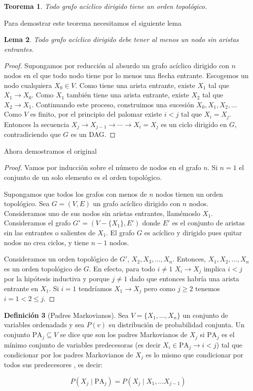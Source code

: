 \documentclass[a4paper,11pt,spanish, twoside]{tfg-uam-matematicas_25-26}
\newtheorem{teor}{Teorema}[chapter]
\newtheorem{lema}[teor]{Lema}
\theoremstyle{definition}
\newtheorem{defin}[teor]{Definición}
\begin{document}
\begin{teor}
Todo grafo acíclico dirigido tiene un orden topológico.
\end{teor}
Para demostrar este teorema necesitamos el siguiente lema
\begin{lema}
Todo grafo acíclico dirigido debe tener al menos un nodo sin aristas entrantes.
\end{lema}
\begin{proof}
Supongamos por reducción al absurdo un grafo acíclico dirigido con $n$ nodos en el que todo nodo tiene por lo menos una flecha entrante. Escogemos un nodo cualquiera $X_0 \in V$. Como tiene una arista entrante, 
existe $X_1$ tal que $X_1 \to X_0$. Como $X_1$ también tiene una arista entrante, existe $X_2$ tal que $X_2 \to X_1$. Continuando este proceso, construimos una sucesión $X_0, X_1, X_2, \ldots$ Como $V$ es finito, por el principio del palomar existe $i < j$ tal que $X_i = X_j$. Entonces la secuencia $X_j \to X_{j-1} \to \cdots \to X_i = X_j$ es un ciclo dirigido en $G$, contradiciendo que $G$ es un DAG.
\end{proof}

Ahora demostramos el original
\begin{proof}
Vamos por inducción sobre el número de nodos en el grafo $n$. Si $n = 1$ el conjunto de un solo elemento es el orden topológico.

Supongamos que todos los grafos con menos de $n$ nodos tienen un orden topológico. Sea $G = (V, E)$ un grafo acíclico dirigido con $n$ nodos. Consideramos uno de sus nodos sin aristas entrantes, llamémoslo $X_1$. Consideramos el grafo $G' = (V - \{X_1\}, E')$ donde $E'$ es el conjunto de aristas sin las entrantes o salientes de $X_1$. El grafo $G$ es acíclico y dirigido pues quitar nodos no crea ciclos, y tiene $n-1$ nodos.

Consideramos un orden topológico de $G'$, $X_2, X_3, \ldots, X_n$. Entonces, $X_1, X_2, \ldots, X_n$ es un orden topológico de $G$. En efecto, para todo $i \neq 1$ $X_i \to X_j$ implica $i < j$ por la hipótesis inductiva y porque $j \neq 1$ dado que entonces habría una arista entrante en $X_1$. Si $i = 1$ tendríamos $X_1 \rightarrow X_j$ pero como $j \geq 2$ tenemos $i = 1 < 2 \leq j$. 
\end{proof}


\begin{defin}[Padres Markovianos]
\label{def:padres-markovianos}
Sea $V = \{X_1, \ldots, X_n\}$ un conjunto de variables ordenadads y sea $P(v)$ su distribución de probabilidad conjunta. Un conjunto $\text{PA}_j \subseteq V$ se dice que son los padres Markovianos de $X_j$ si $\text{PA}_j$ es el mínimo conjunto de variables predecesoras (es decir $X_i \in \text{PA}_j \rightarrow i < j$) tal que condicionar por los padres Markovianos de $X_j$ es lo mismo que condicionar por todos sus predecesores , es decir:

\begin{equation*}
P(X_j\mid \text{PA}_j) = P(X_j \mid X_1, \ldots X_{j-1})
\end{equation*}
\end{defin}
\end{document}
